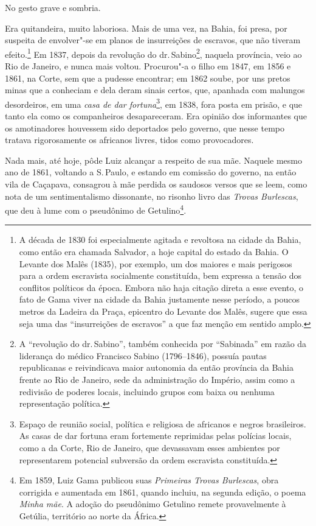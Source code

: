 \noindent\dotfill

No gesto grave e sombria.

Era quitandeira, muito laboriosa. Mais de uma vez, na Bahia, foi presa,
por suspeita de envolver"-se em planos de insurreições de escravos, que
não tiveram efeito.\footnote{A década de 1830 foi especialmente
  agitada e revoltosa na cidade da Bahia, como então era chamada
  Salvador, a hoje capital do estado da Bahia. O Levante dos Malês
  (1835), por exemplo, um dos maiores e mais perigosos para a ordem
  escravista socialmente constituída, bem expressa a tensão dos
  conflitos políticos da época. Embora não haja citação direta a esse
  evento, o fato de Gama viver na cidade da Bahia justamente nesse
  período, a poucos metros da Ladeira da Praça, epicentro do Levante dos
  Malês, sugere que essa seja uma das ``insurreições de escravos'' a que
  faz menção em sentido amplo.} Em 1837, depois da revolução do dr.\,Sabino\footnote{A ``revolução do dr.\,Sabino'', também conhecida por
  ``Sabinada'' em razão da liderança do médico Francisco Sabino
  (1796--1846), possuía pautas republicanas e reivindicava maior
  autonomia da então província da Bahia frente ao Rio de Janeiro, sede
  da administração do Império, assim como a redivisão de poderes locais,
  incluindo grupos com baixa ou nenhuma representação política.},
naquela província, veio ao Rio de Janeiro, e nunca mais voltou.
Procurou"-a o filho em 1847, em 1856 e 1861, na Corte, sem que a pudesse
encontrar; em 1862 soube, por uns pretos minas que a conheciam e dela
deram sinais certos, que, apanhada com malungos desordeiros, em uma
\emph{casa de dar fortuna}\footnote{Espaço de reunião social, política
  e religiosa de africanos e negros brasileiros. As casas de dar fortuna
  eram fortemente reprimidas pelas polícias locais, como a da Corte, Rio
  de Janeiro, que devassavam esses ambientes por representarem potencial
  subversão da ordem escravista constituída.}, em 1838, fora posta em
prisão, e que tanto ela como os companheiros desapareceram. Era opinião
dos informantes que os amotinadores houvessem sido deportados pelo
governo, que nesse tempo tratava rigorosamente os africanos livres,
tidos como provocadores.

Nada mais, até hoje, pôde Luiz alcançar a respeito de sua mãe. Naquele
mesmo ano de 1861, voltando a S.\,Paulo, e estando em comissão do
governo, na então vila de Caçapava, consagrou à mãe perdida os saudosos
versos que se leem, como nota de um sentimentalismo dissonante, no
risonho livro das \emph{Trovas Burlescas}, que deu à lume com o
pseudônimo de Getulino\footnote{Em 1859, Luiz Gama publicou suas
  \emph{Primeiras Trovas Burlescas}, obra corrigida e aumentada em 1861,
  quando incluiu, na segunda edição, o poema \emph{Minha mãe}. A adoção
  do pseudônimo Getulino remete provavelmente à Getúlia, território ao
  norte da África.}.

